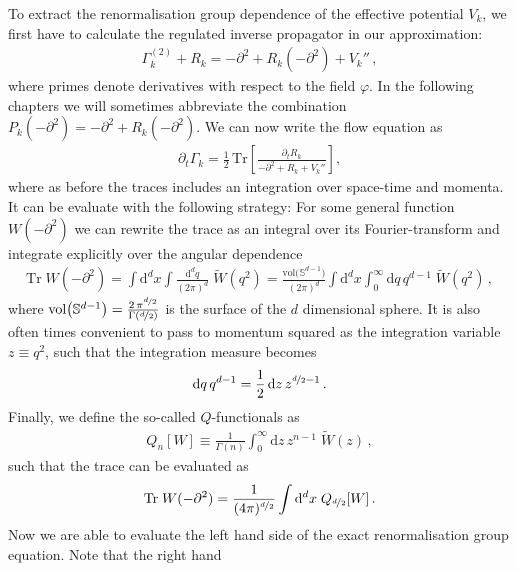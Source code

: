 \documentclass[11pt]{book}
\newcommand{\Tr}{\mathrm{Tr}}
\numberwithin{equation}{chapter}
\begin{document}
To extract the renormalisation group dependence of the effective
potential $V_k$, we first have to calculate the regulated inverse
propagator in our approximation:
\begin{align}
  \Gamma_k^{(2)} + R_k = -\partial^2 + R_k(-\partial^2) + V_k'' \,,
\end{align}
where primes denote derivatives with respect to the field $\varphi$.
In the following chapters we will sometimes abbreviate the combination
$P_k(-\partial^2) = -\partial^2 + R_k(-\partial^2)$. We can now write
the flow equation as
\begin{align}
  \partial_t \Gamma_k = \frac 12 \,
  \Tr \left[
    \frac{ \partial_t R_k }{ -\partial^2 + R_k + V_k'' }
  \right] ,
\end{align}
where as before the traces includes an integration over space-time
and momenta. It can be evaluate with the following strategy: For
some general function $W(-\partial^2)$ we can rewrite the trace as an
integral over its Fourier-transform and integrate explicitly over
the angular dependence
\begin{align}
  \Tr \; W(-\partial^2)
  =
  \int \mathrm d^dx
  \int \frac{ \mathrm d^dq }{ (2\pi)^d } \;
  \tilde W(q^2)
  =
  \frac{ \mathrm{vol} \big( \mathbb S^{d-1}  \big) }{ (2\pi)^d }
  \int \mathrm d^dx
  \int_0^\infty \mathrm dq \, q^{d-1} \;
  \tilde W(q^2) \,,
\end{align}
where
$\mathrm{vol} \big( \mathbb S^{d-1}  \big)
= \frac{ 2 \, \pi^{\nicefrac d2} }{ \Gamma \left( \nicefrac d2 \right) }$
is the surface of the $d$ dimensional sphere.
It is also often times convenient to pass to momentum squared
as the integration variable $z \equiv q^2$,
such that the integration measure becomes
\begin{align}
  \mathrm dq \, q^{d-1} =
  \frac 12 \, \mathrm dz \, z^{\nicefrac d2 - 1} \,.
\end{align}
Finally, we define the so-called $Q$-functionals as
\begin{align}
  Q_n[W]
  \equiv
  \frac{ 1 }{ \Gamma(n) }
  \int_0^\infty \mathrm dz \, z^{n-1} \; \tilde W(z) \,,
  \label{eq:Qfunctionals}
\end{align}
such that the trace can be evaluated as
\begin{align}
  \Tr \; W(-\partial^2)
  =
  \frac{1}{ (4\pi)^{\nicefrac d2} }
  \int \mathrm d^dx \; Q_{\nicefrac d2}[W] \,.
\end{align}
Now we are able to evaluate the left hand side of the exact
renormalisation group equation. Note that the right hand
\end{document}
